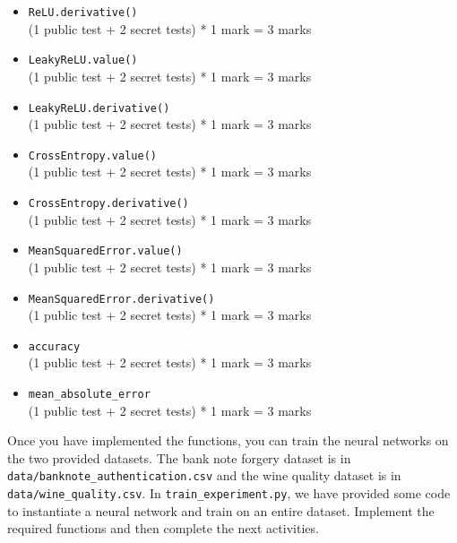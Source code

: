 \documentclass[12pt]{article}
\begin{document}
\begin{enumerate}[font=\Large,label=(\alph*)]
\begin{markscheme}
\begin{itemize}
    \item \verb+ReLU.derivative()+ \\
    (1 public test + 2 secret tests) * 1 mark = 3 marks
    
    \item \verb+LeakyReLU.value()+ \\
    (1 public test + 2 secret tests) * 1 mark = 3 marks
    
    \item \verb+LeakyReLU.derivative()+ \\
    (1 public test + 2 secret tests) * 1 mark = 3 marks
    
    \item \verb+CrossEntropy.value()+ \\
    (1 public test + 2 secret tests) * 1 mark = 3 marks
    
    \item \verb+CrossEntropy.derivative()+ \\
    (1 public test + 2 secret tests) * 1 mark = 3 marks
    
    \item \verb+MeanSquaredError.value()+ \\
    (1 public test + 2 secret tests) * 1 mark = 3 marks
    
    \item \verb+MeanSquaredError.derivative()+ \\
    (1 public test + 2 secret tests) * 1 mark = 3 marks
    
    \item \verb+accuracy+ \\
    (1 public test + 2 secret tests) * 1 mark = 3 marks
    
    \item \verb+mean_absolute_error+ \\
    (1 public test + 2 secret tests) * 1 mark = 3 marks
\end{itemize}
    
\end{markscheme}

\vspace{5pt}
Once you have implemented the functions, you can train the neural networks on the two provided datasets. The bank note forgery dataset is in \\ \texttt{data/banknote\_authentication.csv} and the wine quality dataset is in \\  \texttt{data/wine\_quality.csv}. In \verb+train_experiment.py+, we have provided some code to instantiate a neural network and train on an entire dataset. Implement the required functions and then complete the next activities.


\end{enumerate}
\end{document}

